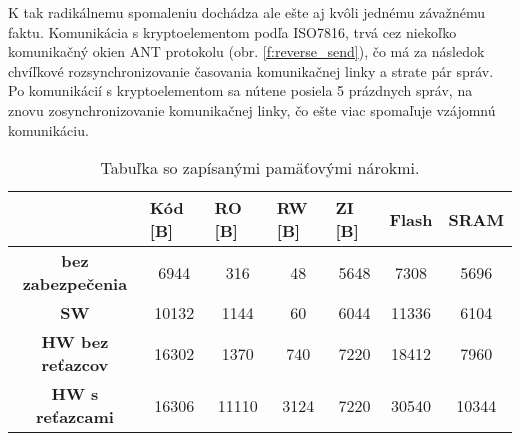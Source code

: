 \documentclass[12pt,a4paper,oneside,openright]{report}
\begin{document}
K tak radikálnemu spomaleniu dochádza ale ešte aj kvôli jednému závažnému faktu. Komunikácia s kryptoelementom podľa ISO7816, trvá cez niekoľko komunikačný okien ANT protokolu (obr. \ref{f:reverse_send}), čo má za následok chvíľkové rozsynchronizovanie časovania komunikačnej linky a strate pár správ. Po komunikácií s kryptoelementom sa nútene posiela 5 prázdnych správ, na znovu zosynchronizovanie komunikačnej linky, čo ešte viac spomaľuje vzájomnú komunikáciu.

\begin{table}[h]
	\centering
	\caption{Tabuľka so zapísanými pamäťovými nárokmi.}
	\label{t:t_memory}
\begin{tabular}{|c|c|c|c|c|c|c|}
	\hline
     & \multicolumn{1}{l|}{\textbf{Kód {[}B{]}}} & \multicolumn{1}{l|}{\textbf{RO {[}B{]}}} & \multicolumn{1}{l|}{\textbf{RW  {[}B{]}}} & \multicolumn{1}{l|}{\textbf{ZI  {[}B{]}}} & \multicolumn{1}{l|}{\textbf{Flash}} & \multicolumn{1}{l|}{\textbf{SRAM}} \\ \hline
	\textbf{bez zabezpečenia} & 6944 & 316 & 48 & 5648 & 7308 & 5696 \\ \hline
	\textbf{SW} & 10132 & 1144 & 60 & 6044 & 11336 & 6104 \\ \hline
	\textbf{HW bez reťazcov} & 16302 & 1370 & 740 & 7220 & 18412 & 7960 \\ \hline
	\textbf{HW s reťazcami} & 16306 & 11110 & 3124 & 7220 & 30540 & 10344 \\ \hline
\end{tabular}
\end{table}


\end{document}
